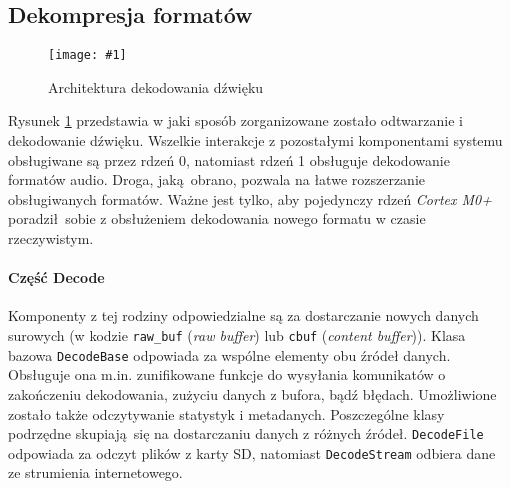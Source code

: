 \documentclass[polish]{aghengthesis}
\newcommand{\imgint}[4]{
	\begin{figure}[{#4}]
		\centering
		\texttt{[image: \#1]}
		\caption{#2}
		\label{#1}
	\end{figure}
}
\newcommand{\imgh}[3]{\imgint{#1}{#2}{#3}{H}}
\begin{document}
		\subsection{Dekompresja formatów}
			\label{sec:decode}
%			
		
			\imgh{3/PicoRadio-sound-decoding}{Architektura dekodowania dźwięku}{0.95}
			
			Rysunek \ref{3/PicoRadio-sound-decoding} przedstawia w jaki sposób zorganizowane zostało odtwarzanie i dekodowanie dźwięku. Wszelkie interakcje z pozostałymi komponentami systemu obsługiwane są przez rdzeń 0, natomiast rdzeń 1 obsługuje dekodowanie formatów audio. Droga, jaką obrano, pozwala na łatwe rozszerzanie obsługiwanych formatów. Ważne jest tylko, aby pojedynczy rdzeń \textit{Cortex M0+} poradził sobie z obsłużeniem dekodowania nowego formatu w czasie rzeczywistym.
			
		
			\paragraph{Część Decode}
				Komponenty z tej rodziny odpowiedzialne są za dostarczanie nowych danych surowych (w kodzie \lstinline|raw_buf| (\textit{raw buffer}) lub \lstinline|cbuf| (\textit{content buffer})). Klasa bazowa \lstinline|DecodeBase| odpowiada za wspólne elementy obu źródeł danych. Obsługuje ona m.in. zunifikowane funkcje do wysyłania komunikatów o zakończeniu dekodowania, zużyciu danych z bufora, bądź błędach. Umożliwione zostało także odczytywanie statystyk i metadanych. Poszczególne klasy podrzędne skupiają się na dostarczaniu danych z różnych źródeł. \lstinline|DecodeFile| odpowiada za odczyt plików z karty SD, natomiast \lstinline|DecodeStream| odbiera dane ze strumienia internetowego.
			
\end{document}
